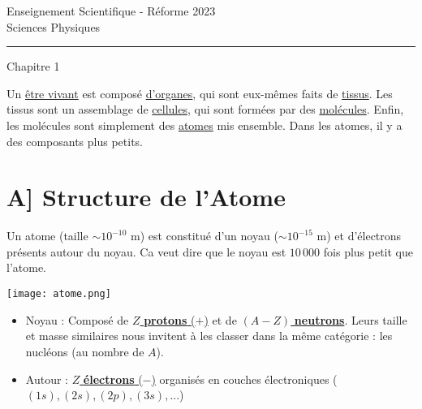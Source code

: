 \documentclass[a4paper]{article}
\begin{document}
\begin{LARGE}
\begin{center}
Enseignement Scientifique - Réforme 2023\\
Sciences Physiques\\[0.2cm]
\hrule
\vspace*{0.2cm}
Chapitre 1
\end{center}
\end{LARGE}

\begin{Large}
\noindent Un \underline{être vivant} est composé \underline{d'organes}, qui sont eux-mêmes faits de \underline{tissus}. Les tissus sont un assemblage de \underline{cellules}, qui sont formées par des \underline{molécules}. Enfin, les molécules sont simplement des \underline{atomes} mis ensemble. Dans les atomes, il y a des composants plus petits.
\section*{A] Structure de l'Atome}
Un atome (taille $\sim 10^{-10}$ m) est constitué d'un noyau ($\sim 10^{-15}$ m) et d'électrons présents autour du noyau. Ca veut dire que le noyau est $10\,000$ fois plus petit que l'atome.\\
\begin{minipage}{0.35\textwidth}
\texttt{[image: atome.png]}
\end{minipage}
\begin{minipage}{0.65\textwidth}
\begin{itemize}
\item Noyau : Composé de \underline{$Z$ \textbf{protons} ($+$)} et de \underline{$(A-Z)$ \textbf{neutrons}}. Leurs taille et masse similaires nous invitent à les classer dans la même catégorie : les nucléons (au nombre de $A$).\\[1cm]
\item Autour : \underline{$Z$ \textbf{électrons} ($-$)} organisés en couches électroniques ($(1s), (2s), (2p), (3s), ...$)
\end{itemize} 
\end{minipage}


\end{Large}
\end{document}
